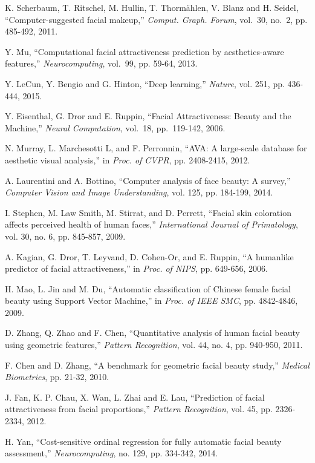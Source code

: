 \documentclass[10pt,conference,a4paper]{IEEEtran}
\begin{document}
\begin{thebibliography}{1}
K. Scherbaum, T. Ritschel, M. Hullin, T. Thorm\"{a}hlen, V. Blanz and H. Seidel, ``Computer-suggested facial makeup,'' \emph{Comput. Graph. Forum}, vol.~30, no.~2, pp. 485-492, 2011.

Y. Mu, ``Computational facial attractiveness prediction by aesthetics-aware features,'' \emph{Neurocomputing}, vol.~99, pp. 59-64, 2013.

Y. LeCun, Y. Bengio and G. Hinton, ``Deep learning,'' \emph{Nature}, vol. 251, pp. 436-444, 2015.

Y. Eisenthal, G. Dror and E. Ruppin, ``Facial Attractiveness: Beauty and the Machine,'' \emph{Neural Computation}, vol.~18, pp.~119-142, 2006.

N. Murray, L. Marchesotti L, and F. Perronnin, ``AVA: A large-scale database for aesthetic visual analysis,'' in \emph{Proc. of CVPR}, pp. 2408-2415, 2012.

A. Laurentini and A. Bottino, ``Computer analysis of face beauty: A survey,'' \emph{Computer Vision and Image Understanding}, vol. 125, pp. 184-199, 2014.

I. Stephen, M. Law Smith, M. Stirrat, and D. Perrett, ``Facial skin coloration affects perceived health of human faces,'' \emph{International Journal of Primatology}, vol. 30, no. 6, pp. 845-857, 2009.

A. Kagian, G. Dror, T. Leyvand, D. Cohen-Or, and E. Ruppin, ``A humanlike predictor of facial attractiveness,'' in \emph{Proc. of NIPS}, pp. 649-656, 2006.

H. Mao, L. Jin and M. Du, ``Automatic classification of Chinese female facial beauty using Support Vector Machine,'' in \emph{Proc. of IEEE SMC}, pp. 4842-4846, 2009.

D. Zhang, Q. Zhao and F. Chen, ``Quantitative analysis of human facial beauty using geometric features,'' \emph{Pattern Recognition}, vol. 44, no. 4, pp. 940-950, 2011.

F. Chen and D. Zhang, ``A benchmark for geometric facial beauty study,'' \emph{Medical Biometrics}, pp. 21-32, 2010.

J. Fan, K. P. Chau, X. Wan, L. Zhai and E. Lau, ``Prediction of facial attractiveness from facial proportions,'' \emph{Pattern Recognition}, vol. 45, pp. 2326-2334, 2012.

H. Yan, ``Cost-sensitive ordinal regression for fully automatic facial beauty assessment,'' \emph{Neurocomputing}, no. 129, pp. 334-342, 2014.


\end{thebibliography}
\end{document}
